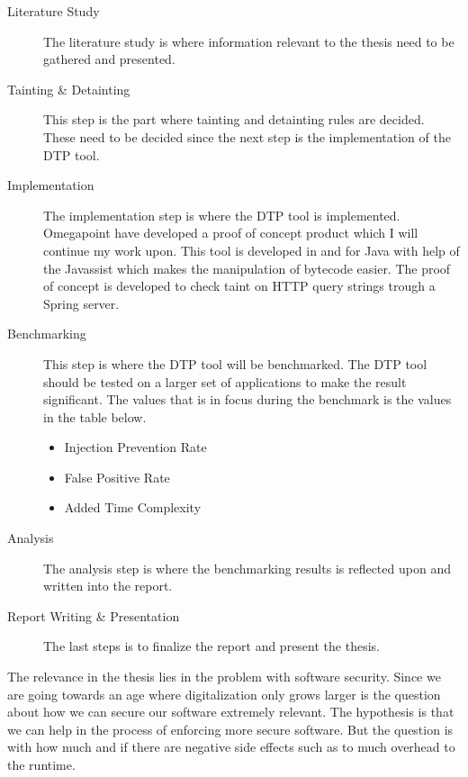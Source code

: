 \documentclass{../kththesis}
\begin{document}
\begin{description}  
	\item [Literature Study]
	The literature study is where information relevant to the thesis need to be gathered and presented.

	\item [Tainting \& Detainting]
	This step is the part where tainting and detainting rules are decided. These need to be decided since the next step is the implementation of the DTP tool.

	\item [Implementation]
	The implementation step is where the DTP tool is implemented. Omegapoint have developed a proof of concept product which I will continue my work upon. This tool is developed in and for Java with help of the Javassist \parencite{javassist} which makes the manipulation of bytecode easier. The proof of concept is developed to check taint on HTTP query strings trough a Spring server.

	\item [Benchmarking]
	This step is where the DTP tool will be benchmarked. The DTP tool should be tested on a larger set of applications to make the result significant. The values that is in focus during the benchmark is the values in the table below. 
	
	\begin{itemize}  
		\item Injection Prevention Rate 
		\item False Positive Rate
		\item Added Time Complexity
	\end{itemize}

	\item [Analysis]
	The analysis step is where the benchmarking results is reflected upon and written into the report.

	\item [Report Writing \& Presentation]
	The last steps is to finalize the report and present the thesis.
\end{description}

\noindent
The relevance in the thesis lies in the problem with software security. Since we are going towards an age where digitalization only grows larger is the question about how we can secure our software extremely relevant. The hypothesis is that we can help in the process of enforcing more secure software. But the question is with how much and if there are negative side effects such as to much overhead to the runtime.
\end{document}
